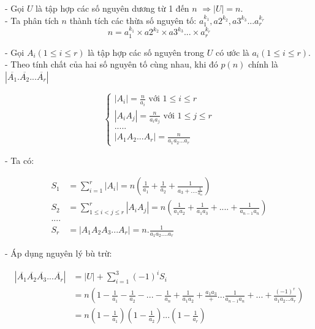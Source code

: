 \documentclass[12pt]{article}
\begin{document}
\begin{sloppypar}
- Gọi \(U\) là tập hợp các số nguyên dương từ 1 đến \(n\) \(\Rightarrow |U| = n\). \\
- Ta phân tích \(n\) thành tích các thừa số nguyên tố: \(a_{1}^{k_{1}},a{2}^{k_{2}}, a{3}^{k_{3}}...a_{r}^{k_{r}}\) \\
\begin{equation*}
    n = a_{1}^{k_{1}} \times a{2}^{k_{2}} \times a{3}^{k_{3}}... \times a_{r}^{k_{r}}
\end{equation*}

- Gọi \(A_{i} (1 \leq i \leq r)\) là tập hợp các số nguyên trong \(U\) có ước là \(a_{i} (1 \leq i \leq r)\). \\
- Theo tính chất của hai số nguyên tố cùng nhau, khi đó \(p(n)\) chính là \(|\overline{A_{1}}.\overline{A_{2}}...\overline{A_{r}}|\) 

\[
    \begin{cases}
        |A_{i}| = \frac{n}{a_{i}} \text{ với } 1 \leq i \leq r \\
        |A_{i}A_{j}| = \frac{n}{a_{i}a_{j}} \text{ với } 1 \leq j \leq r \\
        ..... \\
        |A_{1}A_{2}...A_{r}| = \frac{n}{a_{1}a_{2}...a_{r}}
    \end{cases}
    \]

- Ta có:

\begin{align*}
    S_{1} & = \sum_{i=1}^{r}|A_{i}| = n\left(\frac{1}{a_{1}} + \frac{1}{a_{2}} + \frac{1}{a_{3} + ....\frac{1}{a_{n}}}\right) \\
    S_{2} & = \sum_{1 \leq i < j \leq r}^{r}|A_{i}A_{j}| = n\left(\frac{1}{a_{1}a_{2}} + \frac{1}{a_{1}a_{3}} + .... + \frac{1}{a_{n-1}a_{n}}\right) \\
    .... \\
    S_{r} & = |A_{1}A_{2}A_{3}...A_{r}| = n.\frac{1}{a_{1}a_{2}....a_{r}}
\end{align*}


- Áp dụng nguyên lý bù trừ:

\begin{align*}
    |\overline{A_{1}}\overline{A_{2}}\overline{A_{3}}...\overline{A_{r}}|   & = |U| + \sum_{i=1}^{3}(-1)^{i}S_{i} \\
    & = n\left(1-\frac{1}{a_{1}}-\frac{1}{a_{2}}-...-\frac{1}{a_{n}} + \frac{1}{a_{1}a_{2}} + \frac{a_{1}a_{3}}+...\frac{1}{a_{n-1}a_{n}}+...+\frac{(-1)^r}{a_{1}a_{2}...a_{r}}\right) \\
    & = n\left(1-\frac{1}{a_{1}}\right)\left(1-\frac{1}{a_{2}}\right)...\left(1-\frac{1}{a_{r}}\right)
\end{align*}


\end{sloppypar}
\end{document}
